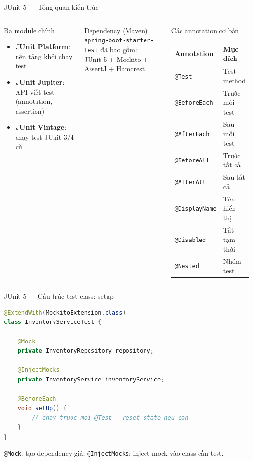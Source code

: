 \documentclass[aspectratio=169,12pt]{beamer}
\begin{document}
\begin{frame}[shrink=14]{JUnit 5 --- Tổng quan kiến trúc}
  \begin{columns}
    \begin{block}{Ba module chính}
      \begin{itemize}
        \item \textbf{JUnit Platform}: nền tảng khởi chạy test
        \item \textbf{JUnit Jupiter}: API viết test (annotation, assertion)
        \item \textbf{JUnit Vintage}: chạy test JUnit 3/4 cũ
      \end{itemize}
    \end{block}

    \begin{block}{Dependency (Maven)}
      \texttt{spring-boot-starter-test} đã bao gồm:\\
      JUnit 5 + Mockito + AssertJ + Hamcrest
    \end{block}

    \begin{block}{Các annotation cơ bản}
      \begin{tabular}{ll}
        \toprule
        \textbf{Annotation} & \textbf{Mục đích} \\
        \midrule
        \texttt{@Test}          & Test method \\
        \texttt{@BeforeEach}    & Trước mỗi test \\
        \texttt{@AfterEach}     & Sau mỗi test \\
        \texttt{@BeforeAll}     & Trước tất cả \\
        \texttt{@AfterAll}      & Sau tất cả \\
        \texttt{@DisplayName}   & Tên hiển thị \\
        \texttt{@Disabled}      & Tắt tạm thời \\
        \texttt{@Nested}        & Nhóm test \\
        \bottomrule
      \end{tabular}
    \end{block}
  \end{columns}
\end{frame}

\begin{frame}[fragile,shrink=12]{JUnit 5 --- Cấu trúc test class: setup}
\begin{lstlisting}[language=java]
@ExtendWith(MockitoExtension.class)
class InventoryServiceTest {

    @Mock
    private InventoryRepository repository;

    @InjectMocks
    private InventoryService inventoryService;

    @BeforeEach
    void setUp() {
        // chay truoc moi @Test - reset state neu can
    }
}
\end{lstlisting}
  {\small \texttt{@Mock}: tạo dependency giả; \texttt{@InjectMocks}: inject mock vào class cần test.}
\end{frame}
\end{document}
